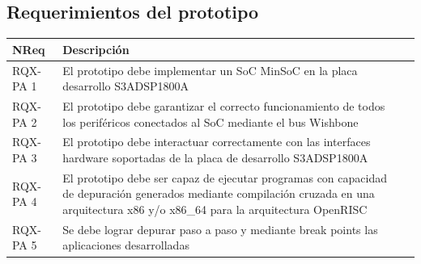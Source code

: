 		\subsection{Requerimientos del prototipo}
		\begin{table}[h]
		\centering
		\begin{tabular}{ p{2.5cm} p{8cm} p{3cm} }
		\hline 
		\rowcolor[gray]{0.8} N\textordmasculine Req & Descripción\\
		\hline 
		RQX-PA 1 & El prototipo debe implementar un SoC MinSoC en la placa desarrollo S3ADSP1800A\\ 
		\hline 
		RQX-PA 2 & El prototipo debe garantizar el correcto funcionamiento de todos los periféricos conectados al SoC mediante el bus Wishbone\\ 
		\hline 
		RQX-PA 3 & El prototipo debe interactuar correctamente con las interfaces hardware soportadas de la placa de desarrollo S3ADSP1800A\\ 
		\hline
		RQX-PA 4 & El prototipo debe ser capaz de ejecutar programas con capacidad de depuración generados mediante compilación
		cruzada en una arquitectura x86 y/o x86\_64 para la arquitectura OpenRISC\\
		\hline
		RQX-PA 5 & Se debe lograr depurar paso a paso y mediante break points las aplicaciones desarrolladas\\
		\hline		
		\end{tabular}
		\end{table}


